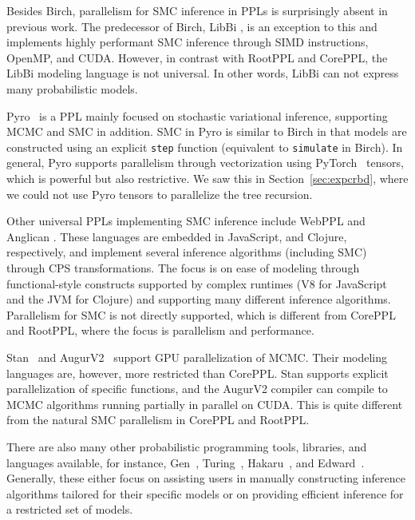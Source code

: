 \documentclass[runningheads]{llncs}
\begin{document}
Besides Birch, parallelism for SMC inference in PPLs is surprisingly absent in previous work.
The predecessor of Birch, LibBi \cite{murray2013bayesian}, is an exception to this and implements highly performant SMC inference through SIMD instructions, OpenMP, and CUDA.
However, in contrast with RootPPL and CorePPL, the LibBi modeling language is not universal.
In other words, LibBi can not express many probabilistic models.

Pyro~\cite{bingham2019pyro} is a PPL mainly focused on stochastic variational inference, supporting MCMC and SMC in addition.
SMC in Pyro is similar to Birch in that models are constructed using an explicit \lstinline!step! function (equivalent to \lstinline!simulate! in Birch).
In general, Pyro supports parallelism through vectorization using PyTorch~\cite{pytorch2021} tensors, which is powerful but also restrictive.
We saw this in Section~\ref{sec:expcrbd}, where we could not use Pyro tensors to parallelize the tree recursion.

Other universal PPLs implementing SMC inference include WebPPL \cite{goodman2014design} and Anglican \cite{wood2014new}.
These languages are embedded in JavaScript, and Clojure, respectively, and implement several inference algorithms (including SMC) through CPS transformations.
The focus is on ease of modeling through functional-style constructs supported by complex runtimes (V8 for JavaScript and the JVM for Clojure) and supporting many different inference algorithms.
Parallelism for SMC is not directly supported, which is different from CorePPL and RootPPL, where the focus is parallelism and performance.

Stan~\cite{carpenter2017stan} and AugurV2~\cite{huang2017compiling} support GPU parallelization of MCMC.
Their modeling languages are, however, more restricted than CorePPL.
Stan supports explicit parallelization of specific functions, and the AugurV2 compiler can compile to MCMC algorithms running partially in parallel on CUDA.
This is quite different from the natural SMC parallelism in CorePPL and RootPPL.

There are also many other probabilistic programming tools, libraries, and languages available, for instance, Gen~\cite{towner2019gen}, Turing~\cite{ge2018turing}, Hakaru~\cite{narayanan2016probabilistic}, and Edward~\cite{tran2016edward}.
Generally, these either focus on assisting users in manually constructing inference algorithms tailored for their specific models or on providing efficient inference for a restricted set of models.
\end{document}

